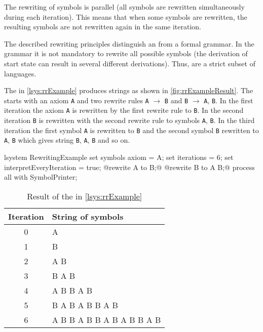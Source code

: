 The rewriting of symbols is parallel (all symbols are rewritten simultaneously during each iteration).
This means that when some symbols are rewritten, the resulting symbols are not rewritten again in the same iteration.

The described rewriting principles distinguish an \lsystem from a formal grammar.
In the grammar it is not mandatory to rewrite all possible symbols (the derivation of start state can result in several different derivations).
Thus, \lsystems are a strict subset of languages.

The \lsystem in \autoref{lsys:rrExample} produces strings as shown in \autoref{fig:rrExampleResult}.
The \lsystem starts with an axiom \texttt{A} and two rewrite rules \texttt{A} $\rightarrow$ \texttt{B} and \texttt{B} $\rightarrow$ \texttt{A}, \texttt{B}.
In the first iteration the axiom \texttt{A} is rewritten by the first rewrite rule to \texttt{B}.
In the second iteration \texttt{B} is rewritten with the second rewrite rule to symbols \texttt{A}, \texttt{B}.
In the third iteration the first symbol \texttt{A} is rewritten to \texttt{B} and the second symbol \texttt{B} rewritten to \texttt{A}, \texttt{B} which gives string \texttt{B}, \texttt{A}, \texttt{B} and so on.

\begin{Lsystem}[label=lsys:rrExample,caption={A simple \lsystem as an example of rewriting principles}]
lsystem RewritingExample {
	set symbols axiom = A;
	set iterations = 6;
	set interpretEveryIteration = true;
	@rewrite A to B;@
	@rewrite B to A B;@
}
process all with SymbolPrinter;
\end{Lsystem}

\begin{table}[h]
	\centering
	\begin{tabular}{c l}
   		\toprule
   		Iteration & String of symbols \\
   		\midrule
		0 & A \\
		1 & B \\
		2 & A B \\
		3 & B A B \\
		4 & A B B A B \\
		5 & B A B A B B A B \\
		6 & A B B A B B A B A B B A B \\
		\bottomrule
	\end{tabular}
	\caption{Result of the \lsystem in \autoref{lsys:rrExample}}
	\label{fig:rrExampleResult}
\end{table}


